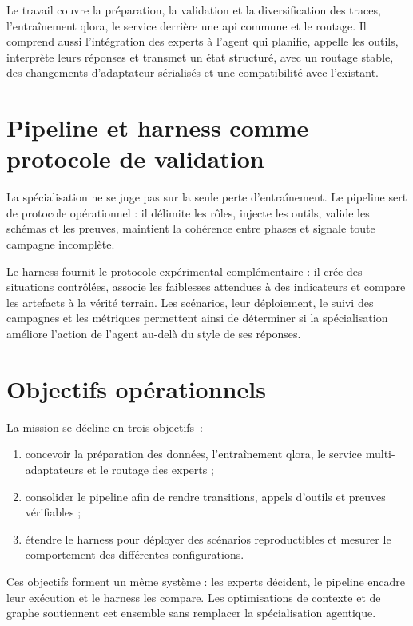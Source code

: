 Le travail couvre la préparation, la validation et la diversification des traces,
l'entraînement \gls{qlora}, le service derrière une \gls{api} commune et le
routage. Il comprend aussi l'intégration des experts à l'agent qui planifie,
appelle les outils, interprète leurs réponses et transmet un état structuré, avec
un routage stable, des changements d'adaptateur sérialisés et une compatibilité
avec l'existant.

\section{Pipeline et harness comme protocole de validation}

La spécialisation ne se juge pas sur la seule perte d'entraînement. Le pipeline
sert de protocole opérationnel : il délimite les rôles, injecte les outils,
valide les schémas et les preuves, maintient la cohérence entre phases et signale
toute campagne incomplète.

Le harness fournit le protocole expérimental complémentaire : il crée des
situations contrôlées, associe les faiblesses attendues à des indicateurs et
compare les artefacts à la vérité terrain. Les scénarios, leur déploiement, le
suivi des campagnes et les métriques permettent ainsi de déterminer si la
spécialisation améliore l'action de l'agent au-delà du style de ses réponses.

\section{Objectifs opérationnels}

La mission se décline en trois objectifs~:

\begin{enumerate}
  \item concevoir la préparation des données, l'entraînement \gls{qlora}, le
  service multi-adaptateurs et le routage des experts ;
  \item consolider le pipeline afin de rendre transitions, appels d'outils et
  preuves vérifiables ;
  \item étendre le harness pour déployer des scénarios reproductibles et mesurer
  le comportement des différentes configurations.
\end{enumerate}

Ces objectifs forment un même système : les experts décident, le pipeline encadre
leur exécution et le harness les compare. Les optimisations de contexte et de
graphe soutiennent cet ensemble sans remplacer la spécialisation agentique.
